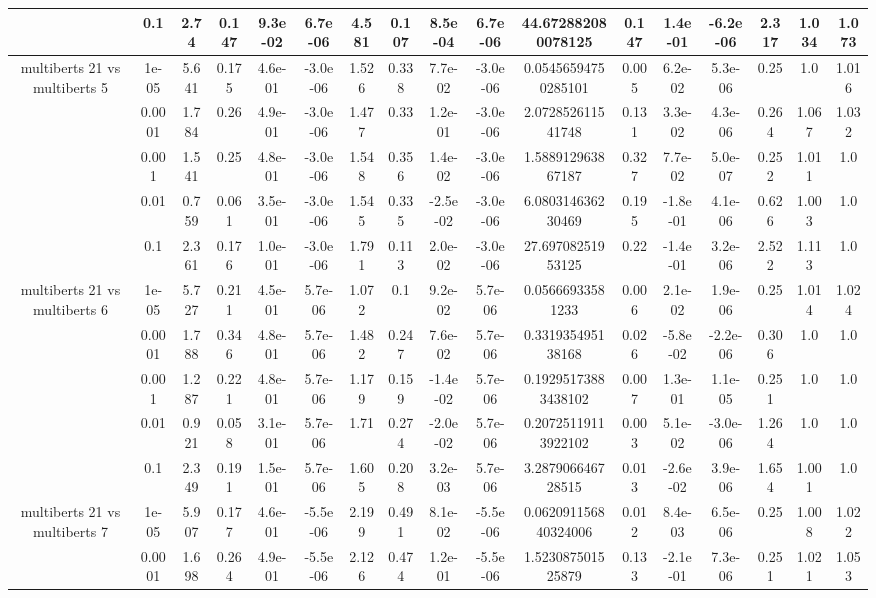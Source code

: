 \begin{tabular}{|c|c|c|c|c|c|c|c|c|c|c|c|c|c|c|c|c|}
 & 0.1 & 2.74 & 0.147 & 9.3e-02 & 6.7e-06 & 4.581 & 0.107 & 8.5e-04 & 6.7e-06 & 44.672882080078125 & 0.147 & 1.4e-01 & -6.2e-06 & 2.317 & 1.034 & 1.073 \\
\hline
\multirow{5}{*}{multiberts 21 vs multiberts 5} & 1e-05 & 5.641 & 0.175 & 4.6e-01 & -3.0e-06 & 1.526 & 0.338 & 7.7e-02 & -3.0e-06 & 0.05456594750285101 & 0.005 & 6.2e-02 & 5.3e-06 & 0.25 & 1.0 & 1.016 \\
 & 0.0001 & 1.784 & 0.26 & 4.9e-01 & -3.0e-06 & 1.477 & 0.33 & 1.2e-01 & -3.0e-06 & 2.072852611541748 & 0.131 & 3.3e-02 & 4.3e-06 & 0.264 & 1.067 & 1.032 \\
 & 0.001 & 1.541 & 0.25 & 4.8e-01 & -3.0e-06 & 1.548 & 0.356 & 1.4e-02 & -3.0e-06 & 1.588912963867187 & 0.327 & 7.7e-02 & 5.0e-07 & 0.252 & 1.011 & 1.0 \\
 & 0.01 & 0.759 & 0.061 & 3.5e-01 & -3.0e-06 & 1.545 & 0.335 & -2.5e-02 & -3.0e-06 & 6.080314636230469 & 0.195 & -1.8e-01 & 4.1e-06 & 0.626 & 1.003 & 1.0 \\
 & 0.1 & 2.361 & 0.176 & 1.0e-01 & -3.0e-06 & 1.791 & 0.113 & 2.0e-02 & -3.0e-06 & 27.69708251953125 & 0.22 & -1.4e-01 & 3.2e-06 & 2.522 & 1.113 & 1.0 \\
\hline
\multirow{5}{*}{multiberts 21 vs multiberts 6} & 1e-05 & 5.727 & 0.211 & 4.5e-01 & 5.7e-06 & 1.072 & 0.1 & 9.2e-02 & 5.7e-06 & 0.05666933581233 & 0.006 & 2.1e-02 & 1.9e-06 & 0.25 & 1.014 & 1.024 \\
 & 0.0001 & 1.788 & 0.346 & 4.8e-01 & 5.7e-06 & 1.482 & 0.247 & 7.6e-02 & 5.7e-06 & 0.331935495138168 & 0.026 & -5.8e-02 & -2.2e-06 & 0.306 & 1.0 & 1.0 \\
 & 0.001 & 1.287 & 0.221 & 4.8e-01 & 5.7e-06 & 1.179 & 0.159 & -1.4e-02 & 5.7e-06 & 0.19295173883438102 & 0.007 & 1.3e-01 & 1.1e-05 & 0.251 & 1.0 & 1.0 \\
 & 0.01 & 0.921 & 0.058 & 3.1e-01 & 5.7e-06 & 1.71 & 0.274 & -2.0e-02 & 5.7e-06 & 0.20725119113922102 & 0.003 & 5.1e-02 & -3.0e-06 & 1.264 & 1.0 & 1.0 \\
 & 0.1 & 2.349 & 0.191 & 1.5e-01 & 5.7e-06 & 1.605 & 0.208 & 3.2e-03 & 5.7e-06 & 3.287906646728515 & 0.013 & -2.6e-02 & 3.9e-06 & 1.654 & 1.001 & 1.0 \\
\hline
\multirow{5}{*}{multiberts 21 vs multiberts 7} & 1e-05 & 5.907 & 0.177 & 4.6e-01 & -5.5e-06 & 2.199 & 0.491 & 8.1e-02 & -5.5e-06 & 0.062091156840324006 & 0.012 & 8.4e-03 & 6.5e-06 & 0.25 & 1.008 & 1.022 \\
 & 0.0001 & 1.698 & 0.264 & 4.9e-01 & -5.5e-06 & 2.126 & 0.474 & 1.2e-01 & -5.5e-06 & 1.523087501525879 & 0.133 & -2.1e-01 & 7.3e-06 & 0.251 & 1.021 & 1.053 \\

\end{tabular}

